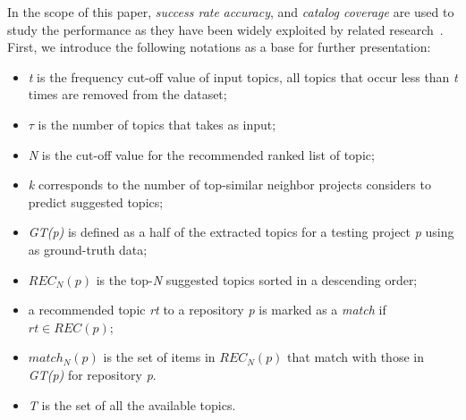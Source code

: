 In the scope of this paper, \emph{success rate} \emph{accuracy}, and 
\emph{catalog coverage} are used to study the \TF performance as they have 
been widely exploited by related research~\cite{Robillard:2014:RSS:2631387}. 
First, we introduce the following notations as a base for further presentation:%
\begin{itemize}[noitemsep,topsep=0pt]
	\item \emph{t} is the frequency cut-off value of input topics, \ie all topics that occur less than \emph{t} times are removed from the dataset;
	\item $\tau$ is the number of topics that \TF takes as input;
	\item \emph{N} is the cut-off value for the recommended ranked list of topic;%
	\item \emph{k} corresponds to the number of top-similar neighbor projects \TF considers to predict suggested topics;
	\item \emph{GT(p)} is defined as a half of the extracted topics for a testing project \emph{p} using as ground-truth data;%
	\item $REC_{N}(p)$ is the top-\emph{N}  suggested topics sorted in a descending order;%
	\item a recommended topic \emph{rt} to a repository \emph{p} is marked as a \emph{match} if $rt \in REC(p)$;
	\item  $match_{N}(p)$ is the set of items in $REC_{N}(p)$ that match with 
	those in \emph{GT(p)} for repository \emph{p}.
	\item \emph{T} is the set of all the available topics.
	
\end{itemize}

